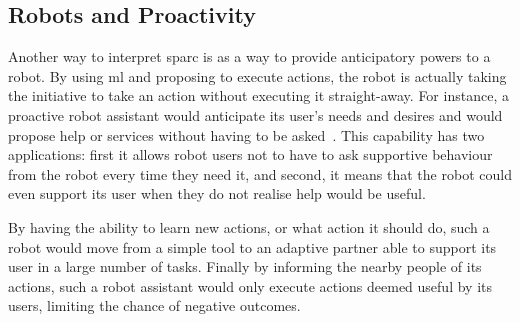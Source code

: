 \subsection{Robots and Proactivity}

Another way to interpret \gls{sparc} is as a way to provide anticipatory powers to a robot. By using \gls{ml} and proposing to execute actions, the robot is actually taking the initiative to take an action without executing it straight-away. For instance, a proactive robot assistant would anticipate its user's needs and desires and would propose help or services without having to be asked~\citep{mason2011robot}. This capability has two applications: first it allows robot users not to have to ask supportive behaviour from the robot every time they need it, and second, it means that the robot could even support its user when they do not realise help would be useful.

By having the ability to learn new actions, or what action it should do, such a robot would move from a simple tool to an adaptive partner able to support its user in a large number of tasks. Finally by informing the nearby people of its actions, such a robot assistant would only execute actions deemed useful by its users, limiting the chance of negative outcomes.

%

